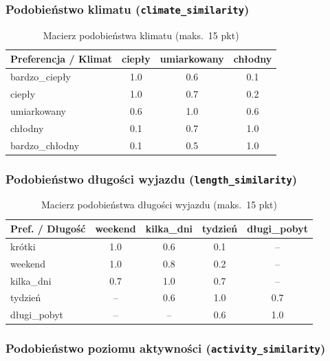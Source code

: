 \documentclass[12pt,a4paper]{article}
\begin{document}
\subsubsection{Podobieństwo klimatu (\texttt{climate\_similarity})}

\begin{table}[H]
\centering
\begin{tabular}{l|ccc}
\toprule
\textbf{Preferencja / Klimat} & \textbf{ciepły} & \textbf{umiarkowany} & \textbf{chłodny} \\
\midrule
bardzo\_ciepły & 1.0 & 0.6 & 0.1 \\
ciepły & 1.0 & 0.7 & 0.2 \\
umiarkowany & 0.6 & 1.0 & 0.6 \\
chłodny & 0.1 & 0.7 & 1.0 \\
bardzo\_chłodny & 0.1 & 0.5 & 1.0 \\
\bottomrule
\end{tabular}
\caption{Macierz podobieństwa klimatu (maks.\ 15 pkt)}
\end{table}

\subsubsection{Podobieństwo długości wyjazdu (\texttt{length\_similarity})}

\begin{table}[H]
\centering
\begin{tabular}{l|cccc}
\toprule
\textbf{Pref. / Długość} & \textbf{weekend} & \textbf{kilka\_dni} & \textbf{tydzień} & \textbf{długi\_pobyt} \\
\midrule
krótki & 1.0 & 0.6 & 0.1 & -- \\
weekend & 1.0 & 0.8 & 0.2 & -- \\
kilka\_dni & 0.7 & 1.0 & 0.7 & -- \\
tydzień & -- & 0.6 & 1.0 & 0.7 \\
długi\_pobyt & -- & -- & 0.6 & 1.0 \\
\bottomrule
\end{tabular}
\caption{Macierz podobieństwa długości wyjazdu (maks.\ 15 pkt)}
\end{table}

\subsubsection{Podobieństwo poziomu aktywności (\texttt{activity\_similarity})}
\end{document}
